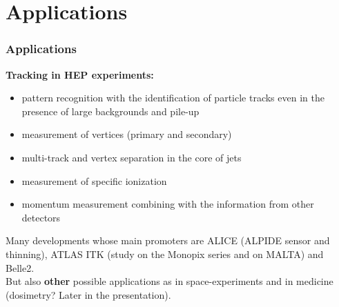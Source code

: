 \section{Applications}
    \begin{frame}
        \frametitle{Applications}
        \textbf{Tracking in HEP experiments:} 
        \begin{itemize}
            \item pattern recognition with the identification of particle tracks even in the presence of large backgrounds and pile-up
            \item measurement of vertices (primary and secondary)
            \item multi-track and vertex separation in the core of jets
            \item measurement of specific ionization
            \item momentum measurement combining with the information from other detectors
        \end{itemize}
        Many developments whose main promoters are ALICE (ALPIDE sensor and thinning), ATLAS ITK (study on the Monopix series and on MALTA) and Belle2.\\
        \medskip
        But also \textbf{other} possible applications as in space-experiments and in medicine (dosimetry? Later in the presentation). 

    \end{frame} 


